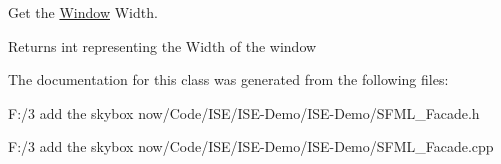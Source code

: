 Get the \hyperlink{class_window}{Window} Width. 

\begin{DoxyReturn}{Returns}
int representing the Width of the window 
\end{DoxyReturn}


The documentation for this class was generated from the following files\-:\begin{DoxyCompactItemize}
\item 
F\-:/3 add the skybox now/\-Code/\-I\-S\-E/\-I\-S\-E-\/\-Demo/\-I\-S\-E-\/\-Demo/S\-F\-M\-L\-\_\-\-Facade.\-h\item 
F\-:/3 add the skybox now/\-Code/\-I\-S\-E/\-I\-S\-E-\/\-Demo/\-I\-S\-E-\/\-Demo/S\-F\-M\-L\-\_\-\-Facade.\-cpp\end{DoxyCompactItemize}
